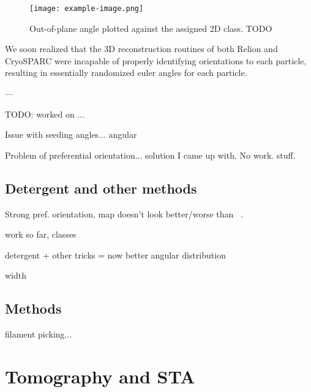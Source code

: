 \begin{figure}[ht]
    \centering
    \texttt{[image: example-image.png]}
    \caption{Out-of-plane angle plotted against the assigned 2D class. TODO}
    \label{fig:ftsz_angle_dist}
\end{figure}

We soon realized that the 3D reconstruction routines of both Relion and CryoSPARC were incapable of properly identifying orientations to each particle, resulting in essentially randomized euler angles for each particle.

---

TODO: worked on ...

Issue with seeding angles... angular

Problem of preferential orientation... solution I came up with. No work. stuff.


\subsection{Detergent and other methods}


Strong pref. orientation, map doesn't look better/worse than ~\cite{fujitaStructuresFtsZSingle2023}.

work so far, classes

detergent + other tricks = now better angular distribution

width

\subsection{Methods}

filament picking...

\section{Tomography and STA}

